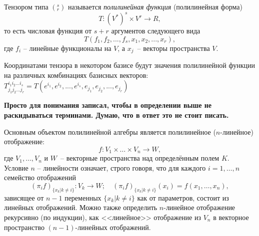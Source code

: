 
\begin{definition}
	Тензором типа $(^s _r)$ называется \textit{полилинейная функция} (полилинейная форма) $$T \colon  (V^*)^s \times V^r\to R,$$ то есть числовая функция от $s+r$ аргументов следующего вида $$T(f_1,f_2,...,f_s,x_1,x_2,...,x_r),$$ где $f_i$ -- линейные функционалы на $V$, а $x_j$ -- векторы пространства $V$.
	
	Координатами тензора в некотором базисе будут значения полилинейной функции на различных комбинациях базисных векторов: $T^{i_1i_2...i_s}_{j_1j_2...j_r}=T(e^{i_1},e^{i_2},...,e^{i_s},e_{j_1},e_{j_2},...,e_{j_r})$
\end{definition}
\begin{remark}
	\textbf{Просто для понимания записал, чтобы в определении выше не раскидываться терминами. Думаю, что в ответ это не стоит писать.}
	
	Основным объектом полилинейной алгебры является полилинейное ($n$-линейное) отображение:
	 $$f : V_1 \times \dots \times V_n \rightarrow W,$$
	где $V_1, \dots, V_n$ и $W$ -- векторные пространства над определённым полем $K$. Условие $n$ -- линейности означает, строго говоря, что для каждого $i = 1, \dots, n$ семейство отображений
	$$(\pi_if)_{\{x_k | k \ne i\}} : V_k \rightarrow W; \quad 
	(\pi_if)_{\{x_k | k \ne i\}}(x_i) = f(x_1, \dots, x_n),$$
	зависящее от $n - 1$ переменных $\{x_k | k \ne i\}$ как от параметров, состоит из линейных отображений. Можно также определить $n$-линейное отображение рекурсивно (по индукции), как <<линейное>> отображение из $V_n$ в векторное пространство $(n - 1)$-линейных отображений.
\end{remark}

